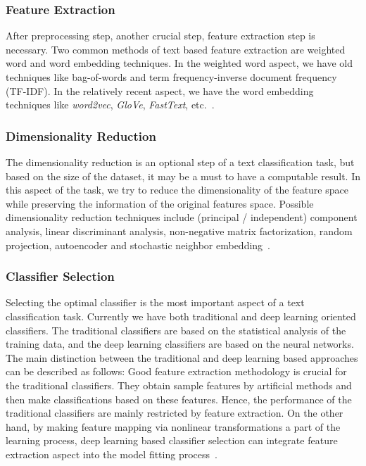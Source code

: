 \subsubsection{Feature Extraction}
After preprocessing step, another crucial step, feature extraction step is necessary. Two common methods of text based feature extraction are weighted word and word embedding techniques. In the weighted word aspect, we have old techniques like bag-of-words and term frequency-inverse document frequency (TF-IDF). In the relatively recent aspect, we have the word embedding techniques like \emph{word2vec}, \emph{GloVe}, \emph{FastText}, etc.~\autocite{kowsari19tc}.

\subsubsection{Dimensionality Reduction}
The dimensionality reduction is an optional step of a text classification task, but based on the size of the dataset, it may be a must to have a computable result. In this aspect of the task, we try to reduce the dimensionality of the feature space while preserving the information of the original features space. Possible dimensionality reduction techniques include (principal / independent) component analysis, linear discriminant analysis, non-negative matrix factorization, random projection, autoencoder and stochastic neighbor embedding~\autocite{kowsari19tc}.

\subsubsection{Classifier Selection}
Selecting the optimal classifier is the most important aspect of a text classification task. Currently we have both traditional and deep learning oriented classifiers. The traditional classifiers are based on the statistical analysis of the training data, and the deep learning classifiers are based on the neural networks. The main distinction between the traditional and deep learning based approaches can be described as follows: Good feature extraction methodology is crucial for the traditional classifiers. They obtain sample features by artificial methods and then make classifications based on these features. Hence, the performance of the traditional classifiers are mainly restricted by feature extraction. On the other hand, by making feature mapping via nonlinear transformations a part of the learning process, deep learning based classifier selection can integrate feature extraction aspect into the model fitting process~\autocite{li20tc}.

